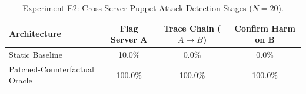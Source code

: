 \begin{table}[t]
\centering
\caption{Experiment E2: Cross-Server Puppet Attack Detection Stages ($N=20$).}
\label{tab:e2_cross_server}
\small
\begin{tabular}{lccc}
\hline
\textbf{Architecture} & \textbf{Flag Server A} & \textbf{Trace Chain ($A \to B$)} & \textbf{Confirm Harm on B} \\
\hline
Static Baseline & 10.0\% & 0.0\% & 0.0\% \\
Patched-Counterfactual Oracle & 100.0\% & 100.0\% & 100.0\% \\
\hline
\end{tabular}
\end{table}
